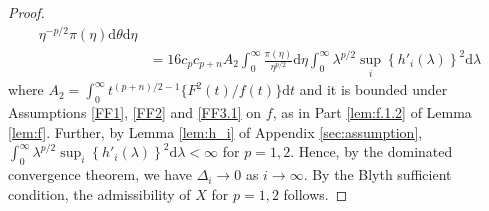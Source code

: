 \documentclass[preprint,11pt]{imsart}
\numberwithin{equation}{section}
\theoremstyle{plain}
\theoremstyle{definition}
\theoremstyle{remark}
\newcommand{\rd}{\mathrm{d}}
\begin{document}
\begin{proof}
\begin{equation}
\begin{split}
\eta^{-p/2}\pi(\eta)\rd\theta \rd\eta \\
 &=16 c_p c_{p+n}A_2 \int_0^\infty \frac{\pi(\eta)}{\eta^{p/2}}\rd \eta
 \int_0^\infty\lambda^{p/2} \sup_i\left\{h'_i(\lambda)\right\}^2\rd \lambda
\end{split}
\end{equation}
 where $A_2=\int_0^\infty t^{(p+n)/2-1}\{F^2(t)/f(t)\}\rd t$ and it is bounded under
 Assumptions \ref{FF1}, \ref{FF2} and \ref{FF3.1} on $f$,
 as in Part \ref{lem:f.1.2} of Lemma \ref{lem:f}.
 Further, 
by Lemma \ref{lem:h_i} of  Appendix \ref{sec:assumption},
$\int_0^\infty\lambda^{p/2} \sup_i\left\{h'_i(\lambda)\right\}^2\rd \lambda<\infty $ for $p=1,2$. 
 Hence, by the dominated convergence theorem,
 we have $\Delta_i\to 0$ as $i\to\infty$. By the Blyth sufficient condition,
 the admissibility of $X$ for $p=1,2$ follows.
 \end{proof}
\end{document}
